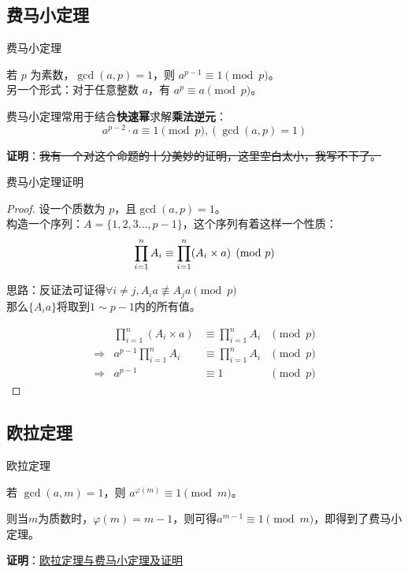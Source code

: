 \subsection{费马小定理}
\begin{frame}[fragile]{费马小定理}
  \begin{theorem}[费马小定理]
    若 $p$ 为素数，$\gcd(a, p) = 1$，则 $a^{p - 1} \equiv 1 \pmod{p}$。\\
    另一个形式：对于任意整数 $a$，有 $a^p \equiv a \pmod{p}$。
  \end{theorem}
  \pause 
  \vspace{0.5cm}

  费马小定理常用于结合\textbf{快速幂}求解\textbf{乘法逆元}：
  $$
  a^{p-2}\cdot a \equiv 1 \pmod{p}, (\gcd(a,p)=1)
  $$

  \pause
  \vspace{0.5cm}
  \textbf{证明}：\sout{我有一个对这个命题的十分美妙的证明，这里空白太小，我写不下了。}
\end{frame}

\begin{frame}[fragile]{费马小定理}{证明}
  \begin{proof}
    设一个质数为 $p$，且$\gcd(a,p)=1$。\\
    构造一个序列：$A=\{1,2,3\dots,p-1\}$，这个序列有着这样一个性质：
    $$
    \prod_{i=1}^{n}\space A_i\equiv\prod_{i=1}^{n} (A_i\times a) \pmod p
    $$
    
    \pause 
    思路：反证法可证得$\forall i\neq j,A_i a\not\equiv A_ja \pmod{p}$
    \\ 那么$\{A_ia\}$将取到$1\sim p-1$内的所有值。
    
    \pause 
    $$
    \begin{aligned}
      & \prod_{i=1}^{n}(A_i\times a) &\equiv\prod_{i=1}^{n} A_i &\pmod{p}\\
      \Rightarrow & a^{p-1}\prod_{i=1}^{n} A_i &\equiv\prod_{i=1}^{n} A_i &\pmod{p}\\
      \Rightarrow & a^{p-1} &\equiv 1 &\pmod{p}
    \end{aligned}
    $$
  \end{proof}
\end{frame}

\subsection{欧拉定理}
\begin{frame}[fragile]{欧拉定理}
  \begin{theorem}[欧拉定理]
    若 $\gcd(a, m) = 1$，则 $a^{\varphi(m)} \equiv 1 \pmod{m}$。
  \end{theorem}
  则当$m$为质数时，$\varphi(m)=m-1$，则可得$a^{m-1}\equiv 1 \pmod{m}$，即得到了费马小定理。
  
  \pause 
  \vspace{1.0cm}
  \textbf{证明}：\href{https://xdbirdie.github.io/2020/07/10/%E6%AC%A7%E6%8B%89%E5%AE%9A%E7%90%86%E4%B8%8E%E8%B4%B9%E9%A9%AC%E5%B0%8F%E5%AE%9A%E7%90%86/}{欧拉定理与费马小定理及证明}
\end{frame}

